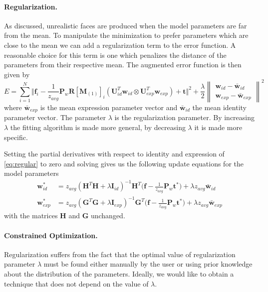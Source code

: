 \documentclass[11pt,a4paper]{report}
\begin{document}
\paragraph{Regularization.}
As discussed, unrealistic faces are produced when the model parameters are far
from the mean. To manipulate the minimization to prefer parameters which are
close to the mean we can add a regularization term to the error function. A reasonable choice for this term is
one which penalizes the distance of the parameters from their respective mean.
The augmented error function is then given by
\begin{equation}\label{eq:regular}
E = \sum_{i=1}^N \Big\Vert\mathbf{f}_i - \frac{1}{z_{avg}}\mathbf{P}_w\mathbf{R}[\mathbf{M}_{(1)}]_{i}(\mathbf{U}_{id}^T\mathbf{w}_{id} \otimes
\mathbf{U}_{exp}^T\mathbf{w}_{exp}) + \mathbf{t}\Big\Vert^2
+ \frac{\lambda}{2}\begin{Vmatrix}\mathbf{w}_{id} - \mathbf{\bar{w}}_{id}\\\mathbf{w}_{exp} - \mathbf{\bar{w}}_{exp}\end{Vmatrix}^2
\end{equation}
where $\mathbf{\bar{w}}_{exp}$ is the mean expression parameter vector and
$\mathbf{\bar{w}}_{id}$ the mean identity parameter vector. The parameter
$\lambda$ is the regularization parameter. By increasing $\lambda$ the fitting
algorithm is made more general, by decreasing $\lambda$ it is made more
specific. 

Setting the partial derivatives with respect to identity and expression of
\ref{eq:regular} to zero and solving gives us the following update equations for
the model parameters
\begin{align}
\mathbf{w}^*_{id} &=z_{avg}(\mathbf{H}^T\mathbf{H} + \lambda\mathbf{I}_{id})^{-1}\mathbf{H}^T\bigl(\mathbf{f}
- \frac{1}{z_{avg}}\mathbf{P}_w\mathbf{t}^*\bigr) + \lambda z_{avg}\mathbf{\bar{w}}_{id}\\
\mathbf{w}^*_{exp} &=z_{avg}(\mathbf{G}^T\mathbf{G} + \lambda\mathbf{I}_{exp})^{-1}\mathbf{G}^T\bigl(\mathbf{f} -
\frac{1}{z_{avg}}\mathbf{P}_w\mathbf{t}^*\bigr) + \lambda z_{avg}\mathbf{\bar{w}}_{exp}
\end{align}
with the matrices $\mathbf{H}$ and $\mathbf{G}$ unchanged.

\paragraph{Constrained Optimization.} Regularization suffers from the fact that
the optimal value of regularization parameter $\lambda$ must be found either
manually by the user or using prior knowledge about the distribution of the
parameters. Ideally, we would like to obtain a technique that does not depend on
the value of $\lambda$.
\end{document}
